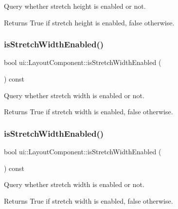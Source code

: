 Query whether stretch height is enabled or not. \begin{DoxyReturn}{Returns}
True if stretch height is enabled, false otherwise. 
\end{DoxyReturn}
\mbox{\label{classui_1_1LayoutComponent_abb95d248959215652769fb5db602ded1}} 
\subsubsection{\texorpdfstring{is\+Stretch\+Width\+Enabled()}{isStretchWidthEnabled()}\hspace{0.1cm}{\footnotesize\ttfamily [1/2]}}
{\footnotesize\ttfamily bool ui\+::\+Layout\+Component\+::is\+Stretch\+Width\+Enabled (\begin{DoxyParamCaption}{ }\end{DoxyParamCaption}) const}

Query whether stretch width is enabled or not. \begin{DoxyReturn}{Returns}
True if stretch width is enabled, false otherwise. 
\end{DoxyReturn}
\mbox{\label{classui_1_1LayoutComponent_abb95d248959215652769fb5db602ded1}} 
\subsubsection{\texorpdfstring{is\+Stretch\+Width\+Enabled()}{isStretchWidthEnabled()}\hspace{0.1cm}{\footnotesize\ttfamily [2/2]}}
{\footnotesize\ttfamily bool ui\+::\+Layout\+Component\+::is\+Stretch\+Width\+Enabled (\begin{DoxyParamCaption}{ }\end{DoxyParamCaption}) const}

Query whether stretch width is enabled or not. \begin{DoxyReturn}{Returns}
True if stretch width is enabled, false otherwise. 
\end{DoxyReturn}
\mbox{\label{classui_1_1LayoutComponent_a71d6fd230951a624210a0501033a9c56}} 
